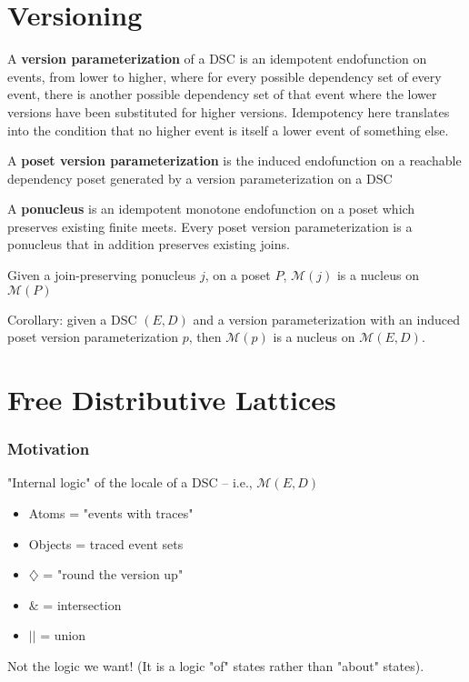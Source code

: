 \documentclass{beamer}
\newcommand{\Mcc}{\mathcal{M}}
\newcommand{\Dia}{\diamondsuit}
\begin{document}
\section{Versioning}
\begin{frame}
\begin{definition}
A \textbf{version parameterization} of a DSC is an idempotent endofunction on events, from lower to higher, where for every possible dependency set of every event, there is another possible dependency set of that event where the lower versions have been substituted for higher versions. Idempotency here translates into the condition that no higher event is itself a lower event of something else.

A \textbf{poset version parameterization} is the induced endofunction on a reachable dependency poset generated by a version parameterization on a DSC
\end{definition}


\end{frame}


\begin{frame}

\begin{lemma}
A \textbf{ponucleus} is an idempotent monotone endofunction on a poset which preserves existing finite meets.
Every poset version parameterization is a ponucleus that in addition preserves existing joins.
\end{lemma}

\begin{theorem}
Given a join-preserving ponucleus \(j\), on a poset \(P\),  \(\Mcc(j)\) is a nucleus on \(\Mcc(P)\)
\end{theorem}

Corollary: given a DSC \((E,D)\) and a version parameterization with an induced poset version parameterization \(p\), then \(\Mcc(p)\) is a nucleus on \(\Mcc(E,D)\).
\end{frame}

\section{Free Distributive Lattices}
\begin{frame}
\frametitle{Motivation}
"Internal logic" of the locale of a DSC  -- i.e., \(\Mcc(E,D)\)
\begin{itemize}
\item Atoms = "events with traces"
\item Objects = traced event sets
\item \(\Dia\) =  "round the version up"
\item \(\&\) = intersection
\item \(||\) = union
\end{itemize}

Not the logic we want! (It is a logic "of" states rather than "about" states).
\end{frame}
\end{document}
